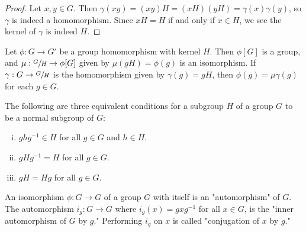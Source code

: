 \documentclass[a4paper,8pt]{article}
\begin{document}
\begin{outline}
    \begin{proof}
      Let \(x, y \in G\). Then \(\gamma(xy) = (xy)H = (xH)(yH) = \gamma(x)\gamma(y)\), so \(\gamma\) is indeed a
      homomorphism. Since \(xH= H\) if and only if \(x \in H\), we see the kernel of \(\gamma\) is
      indeed \(H\).
    \end{proof}

    Let \(\phi: G \rightarrow G'\) be a group homomorphism with kernel \(H\). Then \(\phi[G]\) is a group,
    and \(\mu: \sfrac{G}{H} \rightarrow \phi[G]\) given by \(\mu(gH) = \phi(g)\) is an isomorphism. If
    \(\gamma: G \rightarrow \sfrac{G}{H}\) is the homomorphism given by \(\gamma(g) = gH\), then
    \(\phi(g) = \mu\gamma(g)\) for each \(g \in G\).

    The following are three equivalent conditions for a subgroup \(H\) of a group \(G\) to be a normal subgroup of \(G\):
    \begin{enumerate}[i.]
      \item \(ghg^{-1} \in H\) for all \(g \in G\) and \(h \in H\).
      \item \(gHg^{-1} = H\) for all \(g \in G\).
      \item \(gH = Hg\) for all \(g \in G\).
    \end{enumerate}

    An isomorphism \(\phi: G \rightarrow G\) of a group \(G\) with itself is an "automorphism" of
    \(G\). The automorphism \(i_{g}: G \rightarrow G\) where \(i_{g}(x) = gxg^{-1}\) for all \(x \in G\), is the
    "inner automorphism of \(G\) by \(g\)." Performing \(i_{g}\) on \(x\) is called "conjugation of \(x\) by \(g\)."

\end{outline}
\end{document}
